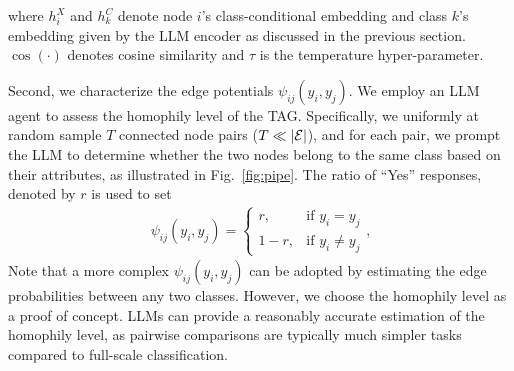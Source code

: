 where $h_i^{X}$ and $h_k^{C}$ denote node $i$'s class-conditional embedding and class $k$'s embedding given by the LLM encoder as discussed in the previous section. %
$\cos(\cdot)$ denotes cosine similarity and $\tau$ is the temperature hyper-parameter. 

Second, we characterize the edge potentials $\psi_{ij}(y_i, y_j)$. We employ an LLM agent to assess the homophily level of the TAG. Specifically, we uniformly at random sample $T$ connected node pairs ($T\ll |\mathcal{E}|$), and for each pair, we prompt the LLM to determine whether the two nodes belong to the same class based on their attributes, as illustrated in Fig.~\ref{fig:pipe}. The ratio of ``Yes'' responses, denoted by $r$ is used to set 
\begin{align}
\label{eq:bp}
\ \psi_{ij}(y_i, y_j) =
\begin{cases}
r, & \text{if } y_i = y_j \\
1-r, & \text{if } y_i \neq y_j
\end{cases},
\end{align}
Note that a more complex $\psi_{ij}(y_i, y_j)$ can be adopted by estimating the edge probabilities between any two classes. However, we choose the homophily level as a proof of concept. LLMs can provide a reasonably accurate estimation of the homophily level, as pairwise comparisons are typically much simpler tasks compared to full-scale classification.


